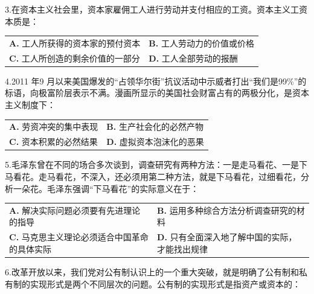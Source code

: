 \documentclass[UTF8,11pt]{ctexart}
\begin{document}
3.在资本主义社会里，资本家雇佣工人进行劳动并支付相应的工资。资本主义工资本质是：


\begin{center}\begin{tabular}{>{\raggedright\arraybackslash}p{\dimexpr(\linewidth-4\tabcolsep)/2\relax}>{\raggedright\arraybackslash}p{\dimexpr(\linewidth-4\tabcolsep)/2\relax}}
\textbf{A.} 工人所获得的资本家的预付资本 & \textbf{B.} 工人劳动力的价值或价格\\[.35em]
\textbf{C.} 工人所创造的剩余价值的一部分 & \textbf{D.} 工人全部劳动的报酬\\[.35em]\end{tabular}\end{center}

4.2011 年9 月以来美国爆发的“占领华尔街”抗议活动中示威者打出“我们是99\%”的标语，向极富阶层表示不满。漫画所显示的美国社会财富占有的两极分化，是资本主义制度下：


\begin{center}\begin{tabular}{>{\raggedright\arraybackslash}p{\dimexpr(\linewidth-4\tabcolsep)/2\relax}>{\raggedright\arraybackslash}p{\dimexpr(\linewidth-4\tabcolsep)/2\relax}}
\textbf{A.} 劳资冲突的集中表现 & \textbf{B.} 生产社会化的必然产物\\[.35em]
\textbf{C.} 资本积累的必然结果 & \textbf{D.} 虚拟资本泡沫化的恶果\\[.35em]\end{tabular}\end{center}

5.毛泽东曾在不同的场合多次谈到，调查研究有两种方法：一是走马看花、一是下马看花。走马看花，不深入，还必须用第二种方法，就是下马看花，过细看花，分析一朵花。毛泽东强调“下马看花”的实际意义在于：


\begin{center}\begin{tabular}{>{\raggedright\arraybackslash}p{\dimexpr(\linewidth-4\tabcolsep)/2\relax}>{\raggedright\arraybackslash}p{\dimexpr(\linewidth-4\tabcolsep)/2\relax}}
\textbf{A.} 解决实际问题必须要有先进理论的指导 & \textbf{B.} 运用多种综合方法分析调查研究的材料\\[.35em]
\textbf{C.} 马克思主义理论必须适合中国革命的具体实际 & \textbf{D.} 只有全面深入地了解中国的实际，才能找出规律\\[.35em]\end{tabular}\end{center}

6.改革开放以来，我们党对公有制认识上的一个重大突破，就是明确了公有制和私有制的实现形式是两个不同层次的问题。公有制的实现形式是指资产或资本的：
\end{document}
